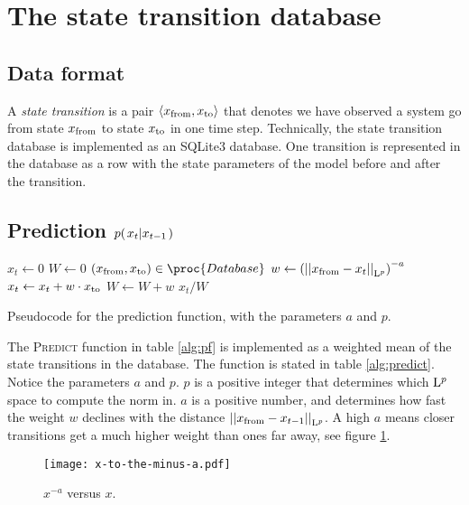 \section{The state transition database}

\subsection{Data format}
A \emph{state transition} is a pair $\trans$ that denotes we have
observed a system go from state $\tf$ to state $\tt$ in one time
step. Technically, the state transition database is implemented as an
SQLite3 database. One transition is represented in the database as a
row with the state parameters of the model before and after the
transition.

\subsection{Prediction $\cprobnext{x}$}

\begin{table}[h]
  \begin{codebox}
    \li $ x_t \gets 0$
    \li $ W \gets 0$
    \li \ForEach $(\tf, \tt) \in \proc{Database}$
    \li \Do
      \li $ w \gets \left(\Lpnorm[p]{\tf - x_t}\right)^{-a}$
      \li $ x_t \gets x_t + w \cdot \tt$
      \li $ W \gets W + w$
    \End
    \li \Return $x_t / W$
  \end{codebox}
  \caption{Pseudocode for the prediction function, with the parameters $a$ and $p$.}
  \label{alg:predict}
\end{table}

The \textsc{Predict} function in table \ref{alg:pf} is implemented as a weighted mean of the
state transitions in the database. The function is stated in table
\ref{alg:predict}. Notice the parameters $a$ and $p$. $p$ is a
positive integer that determines which $\Lp$ space to compute the norm
in. $a$ is a positive number, and determines how fast the weight $w$
declines with the distance $\Lpnorm[p]{\tf - x_{t-1}}$. A high $a$
means closer transitions get a much higher weight than ones far away,
see figure \ref{fig:x-to-the-minus-a}.

\begin{figure}[h]
  \centering
  \texttt{[image: x-to-the-minus-a.pdf]}
  \caption{$x^{-a}$ versus $x$.}
  \label{fig:x-to-the-minus-a}
\end{figure}


